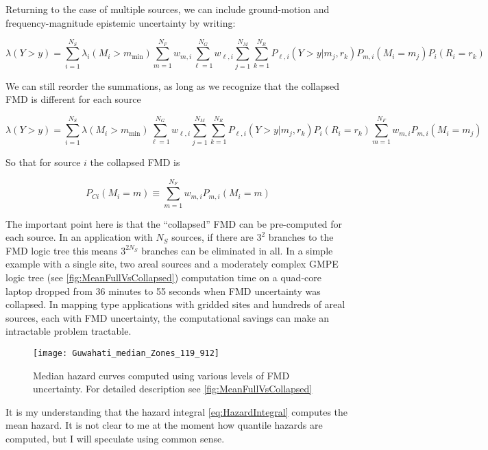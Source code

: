 \documentclass{article}
\begin{document}
Returning to the case of multiple sources, we can include ground-motion and frequency-magnitude epistemic uncertainty by writing:

$$ \lambda(Y > y) = 
\sum_{i=1}^{N_S} 
\lambda_i(M_i > m_\text{min}) 
\sum_{m=1}^{N_F} w_{m,i} 
\sum_{\ell=1}^{N_G} w_{\ell,i}
\sum_{j=1}^{N_M} 
\sum_{k=1}^{N_R} 
P_{\ell,i}(Y > y|m_j,r_k) 
P_{m,i}(M_i=m_j) 
P_i(R_i=r_k) $$

We can still reorder the summations, as long as we recognize that the collapsed FMD is different for each source

$$
\lambda(Y > y) = 
\sum_{i=1}^{N_S} 
\lambda(M_i > m_\text{min}) 
\sum_{\ell=1}^{N_G} w_{\ell,i}
\sum_{j=1}^{N_M} 
\sum_{k=1}^{N_R} 
P_{\ell,i}(Y > y|m_j,r_k) 
P_i(R_i=r_k) 
\sum_{m=1}^{N_F} w_{m,i} 
P_{m,i}(M_i=m_j) 
$$

So that for source $i$ the collapsed FMD is

\begin{equation} \label{eq:CollapsedFmd} 
P_{Ci}(M_i = m) \equiv
\sum_{m=1}^{N_F} w_{m,i} 
P_{m,i}(M_i=m) 
\end{equation}

The important point here is that the ``collapsed'' FMD can be pre-computed for each source. 
In an application with $N_S$ sources, if there are $3^2$ branches to the FMD logic tree this means $3^{2 N_S}$ branches can be eliminated in all. 
In a simple example with a single site, two areal sources and a moderately complex GMPE logic tree (see \autoref{fig:MeanFullVsCollapsed}) computation time on a quad-core laptop dropped from 36 minutes to 55 seconds when FMD uncertainty was collapsed. 
In mapping type applications with gridded sites and hundreds of areal sources, each with FMD uncertainty, the computational savings can make an intractable problem tractable. 

\begin{figure}[!htb]
\begin{adjustbox}{center}
\texttt{[image: Guwahati\_median\_Zones\_119\_912]}
\end{adjustbox}
\caption[Median hazard curves computed using various levels of FMD uncertainty]{Median hazard curves computed using various levels of FMD uncertainty. 
For detailed description see \autoref{fig:MeanFullVsCollapsed}} 
\label{fig:MedianFullVsCollapsed}
\end{figure}

It is my understanding that the hazard integral \eqref{eq:HazardIntegral} computes the mean hazard. 
It is not clear to me at the moment how quantile hazards are computed, but I will speculate using common sense. 
\end{document}
